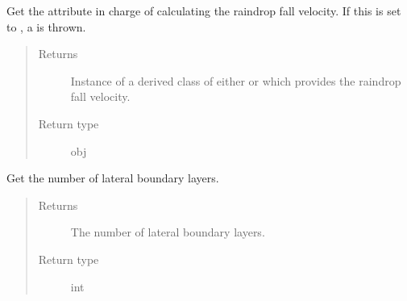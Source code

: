 \documentclass[letterpaper,10pt,english]{sphinxmanual}
\begin{document}
\begin{fulllineitems}
\begin{fulllineitems}
\end{fulllineitems}


\begin{fulllineitems}
\label{\detokenize{api:dycore.prognostic_isentropic.PrognosticIsentropic.microphysics}}
Get the attribute in charge of calculating the raindrop fall velocity.
If this is set to , a  is thrown.
\begin{quote}\begin{description}
\item[{Returns}] \leavevmode
Instance of a derived class of either
 or
which provides the raindrop fall velocity.

\item[{Return type}] \leavevmode
obj

\end{description}\end{quote}

\end{fulllineitems}


\begin{fulllineitems}
\label{\detokenize{api:dycore.prognostic_isentropic.PrognosticIsentropic.nb}}
Get the number of lateral boundary layers.
\begin{quote}\begin{description}
\item[{Returns}] \leavevmode
The number of lateral boundary layers.

\item[{Return type}] \leavevmode
int

\end{description}\end{quote}

\end{fulllineitems}



\end{fulllineitems}
\end{document}
